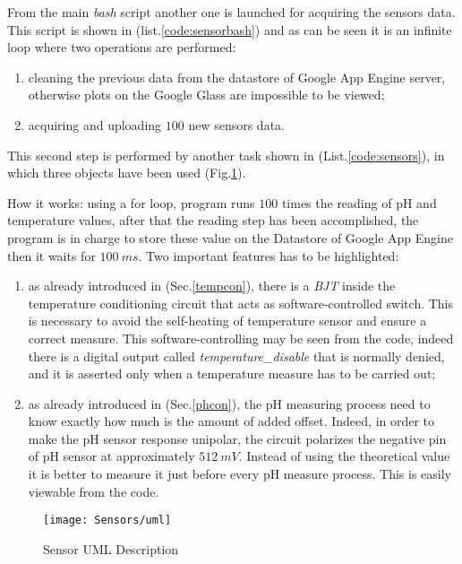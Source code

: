 From the main \textit{bash} script another one is launched for acquiring the sensors data. This script is shown in (list.\ref{code:sensorbash}) and as can be seen it is an infinite loop where two operations are performed:
\begin{enumerate}
	\item cleaning the previous data from the datastore of Google App Engine server, otherwise plots on the Google Glass are impossible to be viewed;
	\item acquiring and uploading $100$ new sensors data. 
\end{enumerate} 

This second step is performed by another task shown in (List.\ref{code:sensors}), in which three objects have been used (Fig.\ref{Fig:umlsensors}). 

How it works: using a for loop, program runs $100$ times the reading of pH and temperature values, after that the reading step has been accomplished, the program is in charge to store these value on the Datastore of Google App Engine then it waits for $100\ ms$. Two important features has to be highlighted:
\begin{enumerate}
	\item as already introduced in (Sec.\ref{tempcon}), there is a \textit{BJT} inside the temperature conditioning circuit that acts as software-controlled switch. This is necessary to avoid the self-heating of temperature sensor and ensure a correct measure. This software-controlling may be seen from the code, indeed there is a digital output called \textit{temperature\_disable} that is normally denied, and it is asserted only when a temperature measure has to be carried out;
	\item as already introduced in (Sec.\ref{phcon}), the pH measuring process need to know exactly how much is the amount of added offset. Indeed, in order to make the pH sensor response unipolar, the circuit polarizes the negative pin of pH sensor at approximately $512\ mV$. Instead of using the theoretical value it is better to measure it just before every pH measure process. This is easily viewable from the code. 
\end{enumerate}   

\begin{figure}[h]
	\centering
	\texttt{[image: Sensors/uml]}
	\caption{Sensor UML Description}
	\label{Fig:umlsensors}
	
\end{figure}

